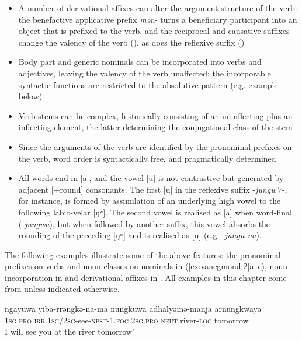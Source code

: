 \documentclass[output=paper]{langscibook}
\begin{document}
\begin{itemize}
\item A number of derivational affixes can alter the argument structure of the verb: the benefactive applicative prefix \textit{mən}- turns a beneficiary participant into an object that is prefixed to the verb, and the reciprocal and causative suffixes change the valency of the verb (), as does the reflexive suffix ()

\item Body part and generic nominals can be incorporated into verbs and adjectives, leaving the valency of the verb unaffected; the incorporable syntactic functions are restricted to the absolutive pattern (e.g. example  below)

\item Verb stems can be complex, historically consisting of an uninflecting plus an inflecting element, the latter determining the conjugational class of the stem

\item Since the arguments of the verb are identified by the pronominal prefixes on the verb, word order is syntactically free, and pragmatically determined

\item All words end in [a], and the vowel [u] is not contrastive but generated by adjacent [+round] consonants. The first [u] in the reflexive suffix -\textit{jungwV}-, for instance, is formed by assimilation of an underlying high vowel to the following labio-velar [ŋʷ]. The second vowel is realised as [a] when word-final (-\textit{jungwa}), but when followed by another suffix, this vowel absorbs the rounding of the preceding [ŋʷ] and is realised as [u] (e.g. -\textit{jungu-na}).

\end{itemize}

The following examples illustrate some of the above features: the pronominal prefixes on verbs and noun classes on nominals in (\ref{ex:vanegmond:2}a--c), noun incorporation in  and derivational affixes in . All examples in this chapter come from \citet{VanEgmond2012} unless indicated otherwise.



\ea%
 \label{ex:vanegmond:2}

 \ea
 \label{ex:vanegmond:2a}
\gll ngayuwa yiba-rrəngkə-na-ma nungkuwa adhalyəmə-manja arnungkwaya\\
\textsc{1sg.pro} \textsc{irr}.\textsc{1sg/2sg}-see-\textsc{npst}-1.\textsc{foc} \textsc{2sg}.\textsc{pro} \textsc{neut}.river-\textsc{loc} tomorrow\\
\glt I will see you at the river tomorrow’
\end{document}

